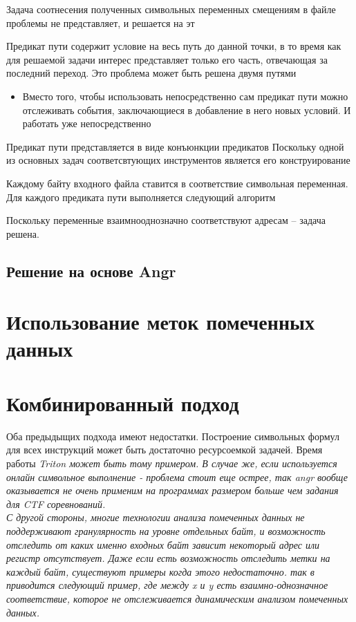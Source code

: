 Задача соотнесения полученных символьных переменных смещениям в файле проблемы не представляет, и решается на эт

Предикат пути содержит условие на весь путь до данной точки, в то время как для решаемой задачи интерес представляет только его часть, отвечающая за последний переход. Это проблема может быть решена двумя путями

\begin{itemize}
    \item Вместо того, чтобы использовать непосредственно сам предикат пути можно отслеживать события, заключающиеся в добавление в него новых условий. И работать уже непосредственно 
\end{itemize}

Предикат пути представляется в виде конъюнкции предикатов
Поскольку одной из основных задач соответсвтующих инструментов является его конструирование

Каждому байту входного файла ставится в соответствие символьная переменная.
Для каждого предиката пути выполняется следующий алгоритм


Поскольку переменные взаимнооднозначно соответствуют адресам -- задача решена.

\subsection{Решение на основе Angr}


\section{Использование меток помеченных данных}

\section{Комбинированный подход}

Оба предыдыщих подхода имеют недостатки. Построение символьных формул для всех инструкций может быть достаточно ресурсоемкой задачей. Время работы \em{Triton} может быть тому примером. В случае же, если используется онлайн символьное выполнение - проблема стоит еще острее, так \em{angr} вообще оказывается не очень применим на программах размером больше чем задания для CTF соревнований.
\\
С другой стороны, многие технологии анализа помеченных данных не поддерживают гранулярность на уровне отдельных байт, и возможность отследить от каких именно входных байт зависит некоторый адрес или регистр отсутствует. Даже если есть возможность отследить метки на каждый байт, существуют примеры когда этого недостаточно. так в \cite{Cavallaro07anti-taint-analysis:practical} приводится следующий пример, где между x и y есть взаимно-однозначное соответствие, которое не отслеживается динамическим анализом помеченных данных.
\\

